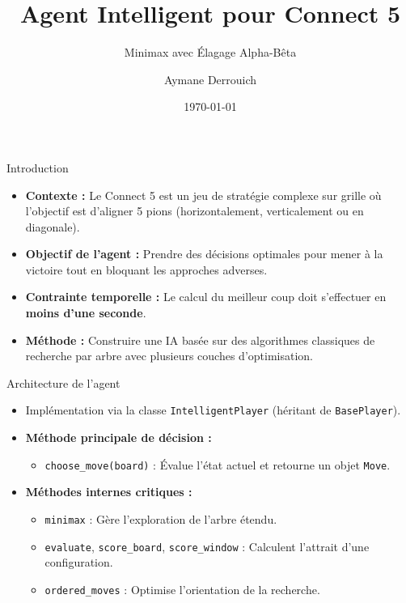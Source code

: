 \documentclass{beamer}
\title{Agent Intelligent pour Connect 5}
\subtitle{Minimax avec Élagage Alpha-Bêta}
\author{Aymane Derrouich}
\date{\today}
\begin{document}
\begin{frame}
    \titlepage
\end{frame}

\begin{frame}{Introduction}
    \begin{itemize}
        \item \textbf{Contexte :} Le Connect 5 est un jeu de stratégie complexe sur grille où l'objectif est d'aligner 5 pions (horizontalement, verticalement ou en diagonale).
        \vspace{0.2cm}
        \item \textbf{Objectif de l'agent :} Prendre des décisions optimales pour mener à la victoire tout en bloquant les approches adverses.
        \vspace{0.2cm}
        \item \textbf{Contrainte temporelle :} Le calcul du meilleur coup doit s'effectuer en \textbf{moins d'une seconde}.
        \vspace{0.2cm}
        \item \textbf{Méthode :} Construire une IA basée sur des algorithmes classiques de recherche par arbre avec plusieurs couches d'optimisation.
    \end{itemize}
\end{frame}

\begin{frame}{Architecture de l'agent}
    \begin{itemize}
        \item Implémentation via la classe \texttt{IntelligentPlayer} (héritant de \texttt{BasePlayer}).
        \vspace{0.3cm}
        \item \textbf{Méthode principale de décision :}
        \begin{itemize}
            \item \texttt{choose\_move(board)} : Évalue l'état actuel et retourne un objet \texttt{Move}.
        \end{itemize}
        \vspace{0.3cm}
        \item \textbf{Méthodes internes critiques :}
        \begin{itemize}
            \item \texttt{minimax} : Gère l'exploration de l'arbre étendu.
            \item \texttt{evaluate}, \texttt{score\_board}, \texttt{score\_window} : Calculent l'attrait d'une configuration.
            \item \texttt{ordered\_moves} : Optimise l'orientation de la recherche.
        \end{itemize}
    \end{itemize}
\end{frame}
\end{document}
